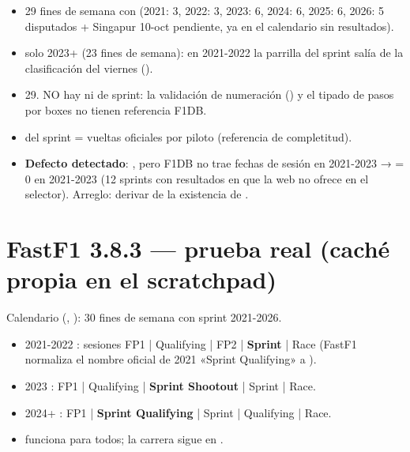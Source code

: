 \begin{itemize}
\item 29 fines de semana con  (2021: 3, 2022: 3, 2023: 6, 2024: 6, 2025: 6, 2026: 5 disputados + Singapur 10-oct pendiente, ya en el calendario sin resultados).
\item {} solo 2023+ (23 fines de semana): en 2021-2022 la parrilla del sprint salía de la clasificación del viernes ().
\item {} 29. NO hay  ni  de sprint: la validación de numeración () y el tipado de pasos por boxes no tienen referencia F1DB.
\item {} del sprint = vueltas oficiales por piloto (referencia de completitud).
\item \textbf{Defecto detectado}: , pero F1DB no trae fechas de sesión en 2021-2023 →  = 0 en 2021-2023 (12 sprints con resultados en  que la web no ofrece en el selector). Arreglo: derivar  de la existencia de .
\end{itemize}

\section{FastF1 3.8.3 — prueba real (caché propia en el scratchpad)}

Calendario (, ): 30 fines de semana con sprint 2021-2026.

\begin{itemize}
\item 2021-2022 : sesiones FP1 | Qualifying | FP2 | \textbf{Sprint} | Race (FastF1 normaliza el nombre oficial de 2021 «Sprint Qualifying» a ).
\item 2023 : FP1 | Qualifying | \textbf{Sprint Shootout} | Sprint | Race.
\item 2024+ : FP1 | \textbf{Sprint Qualifying} | Sprint | Qualifying | Race.
\item {} funciona para todos; la carrera sigue en .
\end{itemize}

